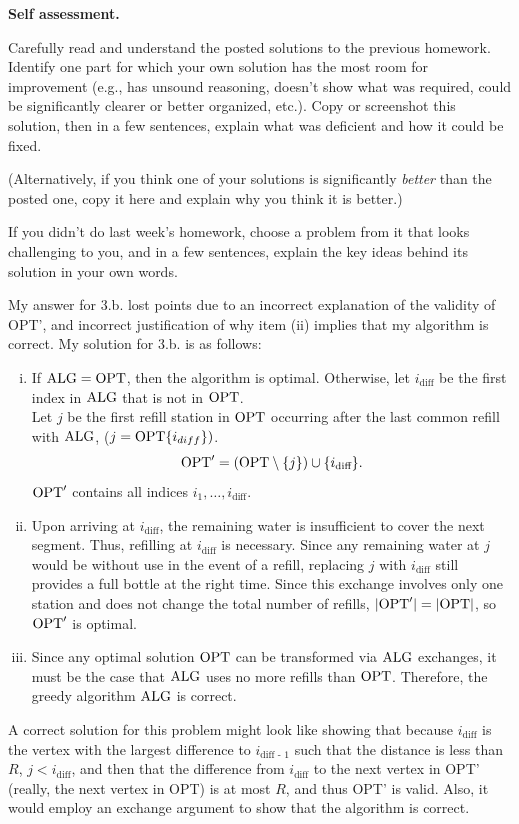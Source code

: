 \documentclass[11pt,addpoints,answers]{exam}
\begin{document}
\hwpreface

\begin{questions}
  \question[10] \textbf{Self assessment.} \nopagebreak
  
  Carefully read and understand the posted solutions to the previous homework.
  Identify one part for which your own solution has the most room for improvement (e.g., has unsound reasoning, doesn’t show what was required, could be significantly clearer or better organized, etc.).
  Copy or screenshot this solution, then in a few sentences, explain what was deficient and how it could be fixed.

  (Alternatively, if you think one of your solutions is significantly \emph{better} than the posted one, copy it here and explain why you think it is better.)

  If you didn't do last week's homework, choose a problem from it that looks challenging to you, and in a few sentences, explain the key ideas behind its solution in your own words.

  \begin{solution} 
  My answer for 3.b. lost points due to an incorrect explanation of the validity of OPT', and incorrect justification of why item (ii) implies that my algorithm is correct. My solution for 3.b. is as follows: 
  \begin{enumerate}[(i)]
    \item If $\text{ALG} = \text{OPT}$, then the algorithm is optimal. Otherwise, let $i_{\text{diff}}$ be the first index in $\text{ALG}$ that is not in $\text{OPT}$.\\
    Let $j$ be the first refill station in $\text{OPT}$ occurring after the last common refill with $\text{ALG}$, ($j=\text{OPT}\{i_{diff}\}) $.
    \[
    \text{OPT}' = (\text{OPT} \setminus \{j\}) \cup \{i_{\text{diff}}\}.
    \]
    $\text{OPT}'$ contains all indices $i_1, \ldots, i_{\text{diff}}$.

    \item
    Upon arriving at $i_{\text{diff}}$, the remaining water is insufficient to cover the next segment. Thus, refilling at $i_{\text{diff}}$ is necessary. Since any remaining water at $j$ would be without use in the event of a refill, replacing $j$ with $i_{\text{diff}}$ still provides a full bottle at the right time. Since this exchange involves only one station and does not change the total number of refills, $|\text{OPT}'| = |\text{OPT}|$, so $\text{OPT}'$ is optimal.

    \item
    Since any optimal solution $\text{OPT}$ can be transformed via $\text{ALG}$ exchanges, it must be the case that $\text{ALG}$ uses no more refills than $\text{OPT}$. Therefore, the greedy algorithm $\text{ALG}$ is correct.
  \end{enumerate}
  A correct solution for this problem might look like showing that because $i_{\text{diff}}$ is the vertex with the largest difference to $i_{\text{diff - 1}}$ such that the distance is less than $R$, $j < i_{\text{diff}}$, and then that the difference from $i_{\text{diff}}$ to the next vertex in OPT' (really, the next vertex in OPT) is at most $R$, and thus OPT' is valid. Also, it would employ an exchange argument to show that the algorithm is correct.
  \end{solution}


\end{questions}
\end{document}
